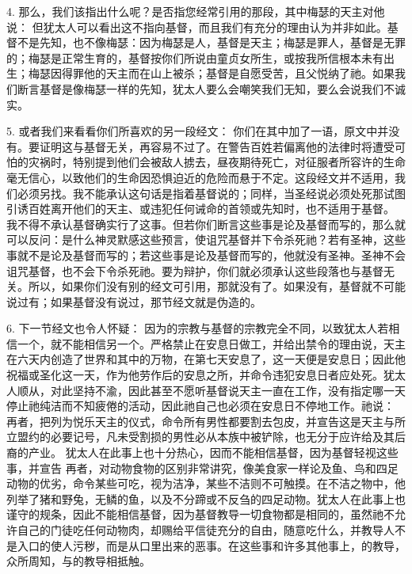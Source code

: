4. 那么，我们该指出什么呢？是否指您经常引用的那段，其中梅瑟的天主对他说： 但犹太人可以看出这不指向基督，而且我们有充分的理由认为并非如此。基督不是先知，也不像梅瑟：因为梅瑟是人，基督是天主；梅瑟是罪人，基督是无罪的；梅瑟是正常生育的，基督按你们所说由童贞女所生，或按我所信根本未有出生；梅瑟因得罪他的天主而在山上被杀；基督是自愿受苦，且父悦纳了祂。如果我们断言基督是像梅瑟一样的先知，犹太人要么会嘲笑我们无知，要么会说我们不诚实。\par

5. 或者我们来看看你们所喜欢的另一段经文： 你们在其中加了一语，原文中并没有。要证明这与基督无关，再容易不过了。在警告百姓若偏离他的法律时将遭受可怕的灾祸时，特别提到他们会被敌人掳去，昼夜期待死亡，对征服者所容许的生命毫无信心，以致他们的生命因恐惧迫近的危险而悬于不定。这段经文并不适用，我们必须另找。我不能承认这句话是指着基督说的；同样，当圣经说必须处死那试图引诱百姓离开他们的天主、或违犯任何诫命的首领或先知时，也不适用于基督。 我不得不承认基督确实行了这事。但若你们断言这些事是论及基督而写的，那么就可以反问：是什么神灵默感这些预言，使诅咒基督并下令杀死祂？若有圣神，这些事就不是论及基督而写的；若这些事是论及基督而写的，他就没有圣神。圣神不会诅咒基督，也不会下令杀死祂。要为辩护，你们就必须承认这些段落也与基督无关。所以，如果你们没有别的经文可引用，那就没有了。如果没有，基督就不可能说过有；如果基督没有说过，那节经文就是伪造的。\par

6. 下一节经文也令人怀疑： 因为的宗教与基督的宗教完全不同，以致犹太人若相信一个，就不能相信另一个。严格禁止在安息日做工，并给出禁令的理由说，天主在六天内创造了世界和其中的万物，在第七天安息了，这一天便是安息日；因此他祝福或圣化这一天，作为他劳作后的安息之所，并命令违犯安息日者应处死。犹太人顺从，对此坚持不渝，因此甚至不愿听基督说天主一直在工作，没有指定哪一天停止祂纯洁而不知疲倦的活动，因此祂自己也必须在安息日不停地工作。祂说： 再者，把列为悦乐天主的仪式，命令所有男性都要割去包皮，并宣告这是天主与所立盟约的必要记号，凡未受割损的男性必从本族中被铲除，也无分于应许给及其后裔的产业。 犹太人在此事上也十分热心，因而不能相信基督，因为基督轻视这些事，并宣告 再者，对动物食物的区别非常讲究，像美食家一样论及鱼、鸟和四足动物的优劣，命令某些可吃，视为洁净，某些不洁则不可触摸。在不洁之物中，他列举了猪和野兔，无鳞的鱼，以及不分蹄或不反刍的四足动物。犹太人在此事上也谨守的规条，因此不能相信基督，因为基督教导一切食物都是相同的，虽然祂不允许自己的门徒吃任何动物肉，却赐给平信徒充分的自由，随意吃什么，并教导人不是入口的使人污秽，而是从口里出来的恶事。在这些事和许多其他事上，的教导，众所周知，与的教导相抵触。\par

